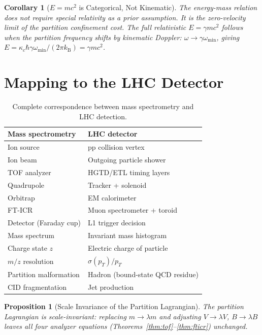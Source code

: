 \documentclass[twocolumn,10pt,a4paper]{article}
\theoremstyle{thmstyle}
\newtheorem{proposition}[theorem]{Proposition}
\newtheorem{corollary}[theorem]{Corollary}
\theoremstyle{definition}
\theoremstyle{remark}
\newcommand{\kB}{k_{\mathrm{B}}}
\begin{document}
\begin{corollary}[$E = mc^2$ is Categorical, Not Kinematic]
\label{cor:emc2_categorical}
The energy-mass relation does not require special relativity as a prior
assumption. It is the zero-velocity limit of the partition confinement cost.
The full relativistic $E = \gamma mc^2$ follows when the partition
frequency shifts by kinematic Doppler: $\omega \to \gamma\omega_{\min}$,
giving $E = \kappa_c\hbar\gamma\omega_{\min}/(2\pi\kB) = \gamma mc^2$.
\end{corollary}

\section{Mapping to the LHC Detector}
\label{sec:lhc_map}

\begin{table}[h]
\centering\small
\caption{Complete correspondence between mass spectrometry and LHC detection.}
\label{tab:mapping}
\begin{tabular}{p{3.8cm}p{3.8cm}}
\toprule
\textbf{Mass spectrometry} & \textbf{LHC detector} \\
\midrule
Ion source & pp collision vertex \\
Ion beam & Outgoing particle shower \\
TOF analyzer & HGTD/ETL timing layers \\
Quadrupole & Tracker + solenoid \\
Orbitrap & EM calorimeter \\
FT-ICR & Muon spectrometer + toroid \\
Detector (Faraday cup) & L1 trigger decision \\
Mass spectrum & Invariant mass histogram \\
Charge state $z$ & Electric charge of particle \\
$m/z$ resolution & $\sigma(p_T)/p_T$ \\
Partition malformation & Hadron (bound-state QCD residue) \\
CID fragmentation & Jet production \\
\bottomrule
\end{tabular}
\end{table}

\begin{proposition}[Scale Invariance of the Partition Lagrangian]
\label{prop:scale}
The partition Lagrangian is scale-invariant: replacing $m \to \lambda m$
and adjusting $V \to \lambda V$, $B \to \lambda B$ leaves all four analyzer
equations (Theorems~\ref{thm:tof}--\ref{thm:fticr}) unchanged.
\end{proposition}
\end{document}
